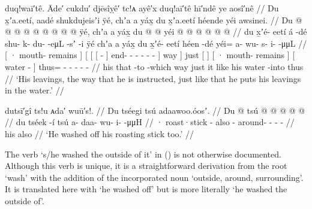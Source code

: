 \ex\label{ex:100-72-instructed-into-water}%
%
\begingl
	\glpreamble	duq!waī′tê. Āde′ cukdu′ djēsîỵê′ tc!ᴀ ayê′x duq!aī′tê hī′ndê ye aosî′nê //
	\glpreamble	Du x̱ʼa.eetí, aadé shukdujeisʼi ÿé, chʼa a yáx̱ du x̱ʼa.eetí héende yéi awsinei. //
	\gla	{} Du  @ {} {}
		{} {} {}  @ {} {}  @ {} @ {} @ {} @ {} @ {} @ {} @ {} ÿé, {}
		chʼa {} a yáx̱ {}
		{} du  @ {} {} 
		{}  @ {} {}
		yéi @  @ {} @ {} @ {} @ {} @ {} //
	\glb	{} du x̱ʼé- eetí {}
		{} {} {} á -dé {} shu- k- du-  -eμL -sʼ -i {} ÿé {}
		chʼa {} a yáx̱ {}
		{} du x̱ʼé- eetí {}
		{} héen -dé {}
		yéi= a- wu- s- i-  -μμL //
	\glc	{}[ · mouth- remains {}]
		{}[ {}[ {}[  - {}]
			end- - -  - - - {}] way {}]
		just {}[   {}]
		{}[ · mouth- remains {}]
		{}[ water - {}]
		thus= - - - -  - //
	\gld	{} his  {} {}
		{} {} {} that -to {}
			 {} {} {} {} {} -which {} way {}
		just {} it like {}
		{} his  {} {} 
		{} water -into {} 
		thus  {} {} {} {} {} //
	\glft	‘His leavings, the way that he is instructed, just like that he puts his leavings in the water.’
		//
\endgl
\xe

\ex\label{ex:100-73-wash-off-stick}%
%
\begingl
	\glpreamble	dutsī′gî ts!u ᴀda′ wuū′s!. //
	\glpreamble	Du tséegi tsú adaawoo.óosʼ. //
	\gla	{} Du  @ {} {} tsú
		 @ {} @ {} @ {} @ {} @ {} //
	\glb	{} du tséek -í {} tsú
		a- daa- wu- i-  -μμH //
	\glc	{} · roast·stick - {} also
		- around- - -  - //
	\gld	{} his  {} {} also
		 {} {} {} {} {} //
	\glft	‘He washed off his roasting stick too.’
		//
\endgl
\xe

The verb  ‘s/he washed the outside of it’ in (\lastx) is not otherwise documented.
Although this verb is unique, it is a straightforward derivation from the root  ‘wash’ with the addition of the incorporated noun  ‘outside, around, surrounding’.
It is translated here with ‘he washed off’ but is more literally ‘he washed the outside of’.


